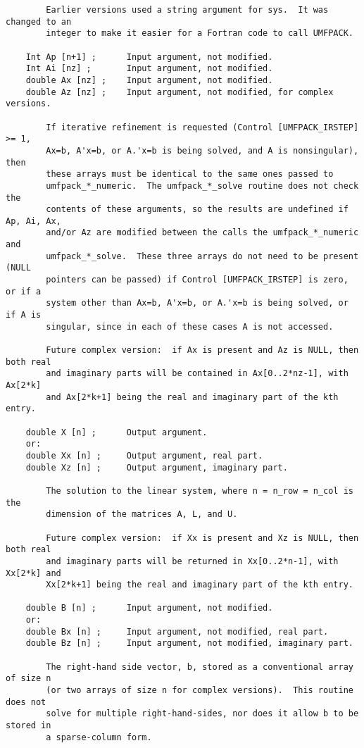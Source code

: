 {\begin{verbatim}
        Earlier versions used a string argument for sys.  It was changed to an
        integer to make it easier for a Fortran code to call UMFPACK.

    Int Ap [n+1] ;      Input argument, not modified.
    Int Ai [nz] ;       Input argument, not modified.
    double Ax [nz] ;    Input argument, not modified.
    double Az [nz] ;    Input argument, not modified, for complex versions.

        If iterative refinement is requested (Control [UMFPACK_IRSTEP] >= 1,
        Ax=b, A'x=b, or A.'x=b is being solved, and A is nonsingular), then
        these arrays must be identical to the same ones passed to
        umfpack_*_numeric.  The umfpack_*_solve routine does not check the
        contents of these arguments, so the results are undefined if Ap, Ai, Ax,
        and/or Az are modified between the calls the umfpack_*_numeric and
        umfpack_*_solve.  These three arrays do not need to be present (NULL
        pointers can be passed) if Control [UMFPACK_IRSTEP] is zero, or if a
        system other than Ax=b, A'x=b, or A.'x=b is being solved, or if A is
        singular, since in each of these cases A is not accessed.

        Future complex version:  if Ax is present and Az is NULL, then both real
        and imaginary parts will be contained in Ax[0..2*nz-1], with Ax[2*k]
        and Ax[2*k+1] being the real and imaginary part of the kth entry.

    double X [n] ;      Output argument.
    or:
    double Xx [n] ;     Output argument, real part.
    double Xz [n] ;     Output argument, imaginary part.

        The solution to the linear system, where n = n_row = n_col is the
        dimension of the matrices A, L, and U.

        Future complex version:  if Xx is present and Xz is NULL, then both real
        and imaginary parts will be returned in Xx[0..2*n-1], with Xx[2*k] and
        Xx[2*k+1] being the real and imaginary part of the kth entry.

    double B [n] ;      Input argument, not modified.
    or:
    double Bx [n] ;     Input argument, not modified, real part.
    double Bz [n] ;     Input argument, not modified, imaginary part.

        The right-hand side vector, b, stored as a conventional array of size n
        (or two arrays of size n for complex versions).  This routine does not
        solve for multiple right-hand-sides, nor does it allow b to be stored in
        a sparse-column form.


\end{verbatim}}

